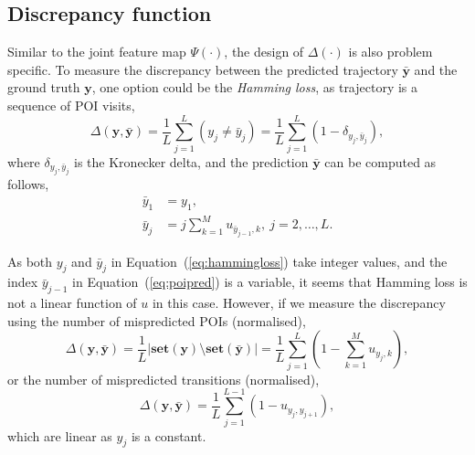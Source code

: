 {\subsection{Discrepancy function}
\label{sec:lossfunc}

Similar to the joint feature map $\Psi(\cdot)$, the design of $\Delta(\cdot)$ is also problem specific.
To measure the discrepancy between the predicted trajectory $\bar{\mathbf{y}}$ and the ground truth $\mathbf{y}$, 
one option could be the \emph{Hamming loss}, as trajectory is a sequence of POI visits, 
\begin{equation}
\label{eq:hammingloss}
\Delta(\mathbf{y}, \bar{\mathbf{y}}) = \frac{1}{L} \sum_{j=1}^L (y_j \neq \bar{y}_j) = \frac{1}{L} \sum_{j=1}^L \left(1 - \delta_{y_j, \bar{y}_j} \right),
\end{equation}
where $\delta_{y_j, \bar{y}_j}$ is the Kronecker delta,
and the prediction $\bar{\mathbf{y}}$ can be computed as follows,
\begin{align}
\bar{y}_1 &= y_1, \\
\bar{y}_j &= j \sum_{k=1}^M u_{\bar{y}_{j-1}, k},~ j=2,\dots,L.  \label{eq:poipred}
\end{align}

As both $y_j$ and $\bar{y}_j$ in Equation~(\ref{eq:hammingloss}) take integer values,
and the index $\bar{y}_{j-1}$ in Equation~(\ref{eq:poipred}) is a variable,
it seems that Hamming loss is not a linear function of $u$ in this case.
However, if we measure the discrepancy using the number of mispredicted POIs (normalised),
\begin{equation}
\Delta(\mathbf{y}, \bar{\mathbf{y}}) = \frac{1}{L} | \textbf{set}(\mathbf{y}) \setminus \textbf{set}(\bar{\mathbf{y}}) | 
                                     = \frac{1}{L} \sum_{j=1}^L \left( 1 - \sum_{k=1}^M u_{y_j, k} \right),
\end{equation}
or the number of mispredicted transitions (normalised),
\begin{equation}
\Delta(\mathbf{y}, \bar{\mathbf{y}}) = \frac{1}{L} \sum_{j=1}^{L-1} \left( 1 - u_{y_j, y_{j+1}} \right),
\end{equation}
which are linear as $y_j$ is a constant.



}
